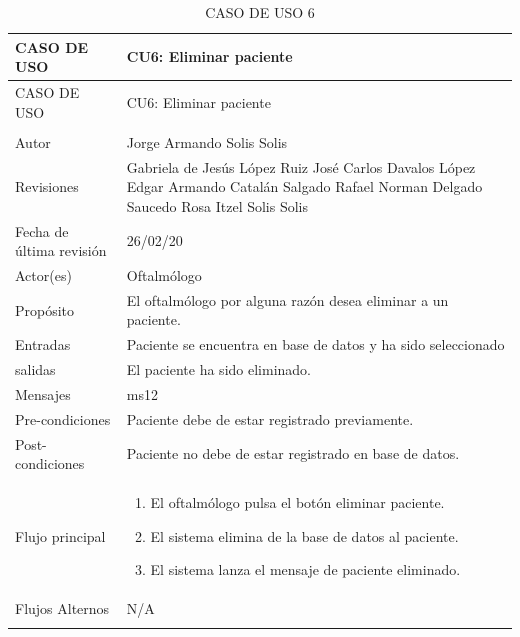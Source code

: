 \documentclass[10pt]{article}
\begin{document}
\begin{longtable}{|p{3.8cm}|p{10.8cm}|}
\hline
CASO DE USO & CU6: Eliminar paciente\\
\hline 
\endfirsthead

\hline

CASO DE USO & CU6: Eliminar paciente\\
\hline 
\endhead

\multicolumn{2}{c}{}
\endfoot

\endlastfoot
\hline
versión & 1\\
\hline
Autor & Jorge Armando Solis Solis\\
\hline
Revisiones & Gabriela de Jesús López Ruiz\newline
José Carlos Davalos López\newline
Edgar Armando Catalán Salgado\newline
Rafael Norman Delgado Saucedo\newline
Rosa Itzel Solis Solis
\\

\hline
Fecha de última revisión & 26/02/20\\
\hline
Actor(es) & Oftalmólogo \\
\hline
Propósito & El oftalmólogo por alguna razón desea eliminar a un paciente. \\
\hline
Entradas & Paciente se encuentra en base de datos y ha sido seleccionado\\
\hline
salidas & El paciente ha sido eliminado. \\
\hline
Mensajes & ms12\\
\hline
Pre-condiciones & Paciente debe de estar registrado previamente.\\
\hline
Post-condiciones & Paciente no debe de estar registrado en base de datos.\\
\hline
Flujo principal & \begin{enumerate}
    \item El oftalmólogo pulsa el botón eliminar paciente.
    \item El sistema elimina de la base de datos al paciente.
    \item El sistema lanza el mensaje de paciente eliminado.
    
\end{enumerate}
    \\
\hline
Flujos Alternos &  
    N/A\\
\hline
\caption{CASO DE USO 6}
\label{tabla1}
\end{longtable}
\end{document}
